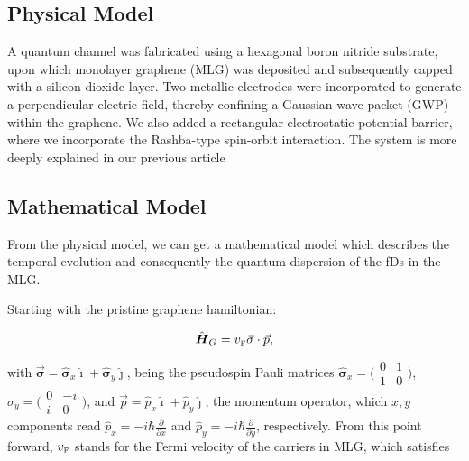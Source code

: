    \subsection{Physical Model}\label{subsec:physical-model}

    A quantum channel was fabricated using a hexagonal boron nitride substrate, upon which monolayer graphene (MLG) was deposited and subsequently capped with a silicon dioxide layer.
     Two metallic electrodes were incorporated to generate a perpendicular electric field, thereby confining a Gaussian wave packet (GWP) within the graphene.
     We also added a rectangular electrostatic potential barrier, where we incorporate the Rashba-type spin-orbit interaction.
     The system is more deeply explained in our previous article\cite{Serna2019}


    \subsection{Mathematical Model}\label{subsec:mathematical-model}

    From the physical model, we can get a mathematical model which describes the temporal evolution and consequently the quantum dispersion of the fDs in the MLG\@.

    Starting with the pristine graphene hamiltonian\cite{Geimk2007}:

    \begin{equation}
        \label{eq:pristGr}
        \hat{\mbox{\boldmath $H$}}_G = v_{\mbox{\tiny F}}\vec{\mathbf{\sigma}}\cdot\vec{p},
    \end{equation}

    \noindent with $\vec{\mathbf{\sigma}} = \hat{\mathbf{\sigma}}_{x}\hat{\imath} + \hat{\mathbf{\sigma}}_{y}\hat{\jmath}$, being the pseudospin Pauli matrices $\hat{\mathbf{\sigma}}_{x} = \bigl(\begin{smallmatrix}0&1 \\ 1&0\end{smallmatrix} \bigr)$, $\hat{\sigma}_{y} = \bigl(\begin{smallmatrix}0&-i \\ i&0\end{smallmatrix} \bigr)$, and $\vec{p}=\hat{p}_{x}\hat{\imath}+\hat{p}_{y}\hat{\jmath}$, the momentum operator, which $x, y$ components read $\hat{p}_{x} = -i\hbar\frac{\partial}{\partial x}$ and $\hat{p}_{y} = -i\hbar\frac{\partial}{\partial y}$, respectively.
    From this point forward, $v_{\mbox{\tiny F}}$ stands for the Fermi velocity of the carriers in MLG, which satisfies

